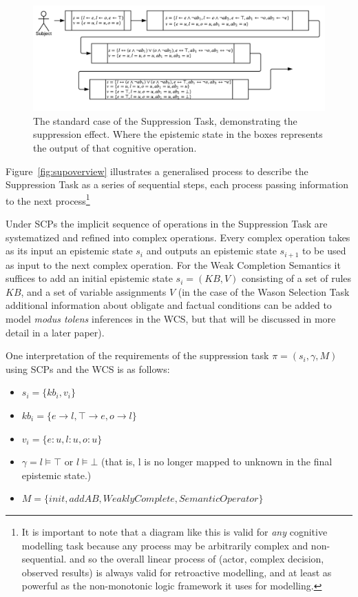\documentclass{article}
\begin{document}
\begin{figure}
\begin{center}
 \centering \includegraphics[scale=0.75]{suppressionSCP_normal}
\caption{The standard case of the Suppression Task, demonstrating the suppression effect. Where the epistemic state in the boxes represents the output of that cognitive operation.}
\label {fig:supnormal}
\end{center}
\end{figure}

Figure~\ref{fig:supoverview} illustrates a generalised process to describe the Suppression Task as a series of sequential steps, each process passing information to the next process\footnote{It is important to note that a diagram like this is valid for \textit{any} cognitive modelling task because any process may be arbitrarily complex and non-sequential. and so the overall linear process of (actor, complex decision, observed results) is always valid for retroactive modelling, and at least as powerful as the non-monotonic logic framework it uses for modelling.}

Under SCPs the implicit sequence of operations in the Suppression Task are systematized and refined into complex operations. Every complex operation takes as its input an epistemic state $s_i$ and outputs an epistemic state $s_{i+1}$ to be used as input to the next complex operation. For the Weak Completion Semantics it suffices to add an initial epistemic state $s_i=(KB,V)$ consisting of a set of rules $KB$, and a set of variable assignments $V$ (in the case of the Wason Selection Task additional information about obligate and factual conditions can be added to model \textit{modus tolens} inferences in the WCS, but that will be discussed in more detail in a later paper).

One interpretation of the requirements of the suppression task $\pi=(s_i,\gamma,M)$ using SCPs and the WCS is as follows: 
\begin{itemize}
\item $s_i=\{kb_i, v_i\}$
\item $kb_i=\{e \rightarrow l, \top \rightarrow e, o \rightarrow l\}$
\item $v_i=\{e:u, l:u, o:u\}$
\item $\gamma = l\models \top $ or $l \models \bot$ (that is, l is no longer mapped to unknown in the final epistemic state.)
\item $M=\{init, addAB, WeaklyComplete, Semantic Operator\}$
\end{itemize}
\end{document}
